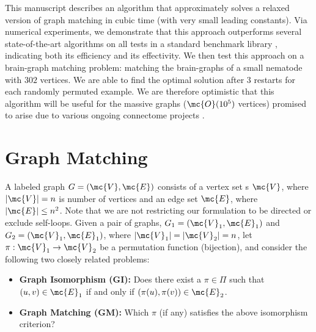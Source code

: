 \documentclass[10pt,journal,cspaper,compsoc]{IEEEtran}
\begin{document}
This manuscript describes an algorithm that approximately solves a relaxed version of graph matching in cubic time (with very small leading constants).  Via numerical experiments, we demonstrate that this approach outperforms several state-of-the-art algorithms on all tests in a standard benchmark library \cite{Burkard1997}, indicating both its efficiency and its effectivity. We then test this approach on a brain-graph matching problem: matching the brain-graphs of a small nematode with $302$ vertices.  We are able to find the optimal solution after $3$ restarts for each randomly permuted example.  We are therefore optimistic that this algorithm will be useful for the massive graphs ($\mc{O}(10^5)$ vertices)  promised to arise due to various ongoing connectome projects \cite{HCP,OCP}.












\section{Graph  Matching} %
\label{sub:preliminaries}


A labeled graph $G=(\mc{V},\mc{E})$ consists of a vertex set s $\mc{V}$, where $|\mc{V}|=n$ is number of vertices and an edge set $\mc{E}$, where $|\mc{E}| \leq n^2$. Note that we are not restricting our formulation to be directed or exclude self-loops. Given a pair of graphs, $G_1=(\mc{V}_1,\mc{E}_1)$ and $G_2=(\mc{V}_1,\mc{E}_1)$, where $|\mc{V}_1|=|\mc{V}_2|=n$, 
let $\pi: \mc{V}_1 \to \mc{V}_2$ be a permutation function (bijection), and consider the following two closely related problems:
\begin{itemize}
	\item \textbf{Graph Isomorphism (GI):}  Does there exist a $\pi \in \Pi$ such that $(u,v) \in \mc{E}_1$ if and only if $(\pi(u),\pi(v)) \in \mc{E}_2$. 
		\item \textbf{Graph Matching (GM):} Which $\pi$ (if any) satisfies the above isomorphism criterion?
\end{itemize}
\end{document}
